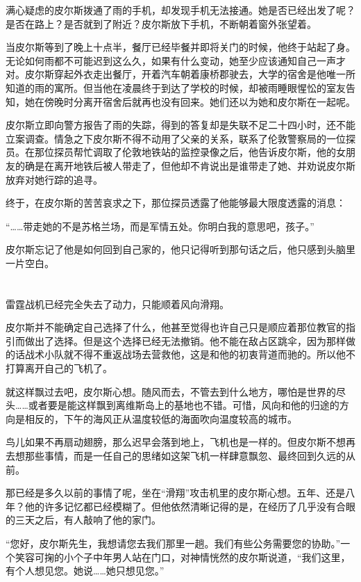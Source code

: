 满心疑虑的皮尔斯拨通了雨的手机，却发现手机无法接通。她是否已经出发了呢？是否在路上？是否就到了附近？皮尔斯放下手机，不断朝着窗外张望着。

当皮尔斯等到了晚上十点半，餐厅已经毕餐并即将关门的时候，他终于站起了身。无论如何雨都不可能迟到这么久，如果有什么变动，她至少应该通知自己一声才对。皮尔斯穿起外衣走出餐厅，开着汽车朝着康桥郡驶去，大学的宿舍是他唯一所知道的雨的寓所。但当他在凌晨终于到达了学校的时候，却被雨睡眼惺忪的室友告知，她在傍晚时分离开宿舍后就再也没有回来。她们还以为她和皮尔斯在一起呢。

皮尔斯立即向警方报告了雨的失踪，得到的答复却是失联不足二十四小时，还不能立案调查。情急之下皮尔斯不得不动用了父亲的关系，联系了伦敦警察局的一位探员。在那位探员帮忙调取了伦敦地铁站的监控录像之后，他告诉皮尔斯，他的女朋友的确是在离开地铁后被人带走了，但他却不肯说出是谁带走了她、并劝说皮尔斯放弃对她行踪的追寻。

终于，在皮尔斯的苦苦哀求之下，那位探员透露了他能够最大限度透露的消息：

“……带走她的不是苏格兰场，而是军情五处。你明白我的意思吧，孩子。”

皮尔斯忘记了他是如何回到自己家的，他只记得听到那句话之后，他只感到头脑里一片空白。

\section*{}

雷霆战机已经完全失去了动力，只能顺着风向滑翔。

皮尔斯并不能确定自己选择了什么，他甚至觉得也许自己只是顺应着那位教官的指引而做出了选择。但是这个选择已经无法撤销。他不能在敌占区跳伞，因为那样做的话战术小队就不得不重返战场去营救他，这是和他的初衷背道而驰的。所以他不打算离开自己的飞机了。

就这样飘过去吧，皮尔斯心想。随风而去，不管去到什么地方，哪怕是世界的尽头……或者要是能这样飘到离维斯岛上的基地也不错。可惜，风向和他的归途的方向是相反的，下午的海风正从温度较低的海面吹向温度较高的城市。

鸟儿如果不再扇动翅膀，那么迟早会落到地上，飞机也是一样的。但皮尔斯不想再去想那些事情，而是一任自己的思绪如这架飞机一样肆意飘忽、最终回到久远的从前。

那已经是多久以前的事情了呢，坐在“滑翔”攻击机里的皮尔斯心想。五年、还是八年？他的许多记忆都已经模糊了。但他依然清晰记得的是，在经历了几乎没有合眼的三天之后，有人敲响了他的家门。

“您好，皮尔斯先生，我想请您去我们那里一趟。我们有些公务需要您的协助。”一个笑容可掬的小个子中年男人站在门口，对神情恍然的皮尔斯说道，“我们这里，有个人想见您。她说……她只想见您。”

